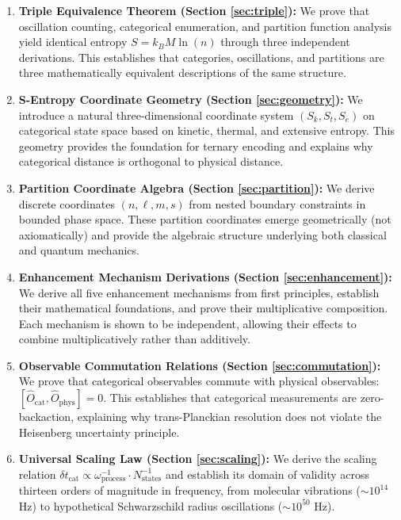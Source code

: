 \documentclass[twocolumn,10pt]{article}
\theoremstyle{remark}
\begin{document}
\begin{enumerate}
    \item \textbf{Triple Equivalence Theorem (Section \ref{sec:triple}):} We prove that oscillation counting, categorical enumeration, and partition function analysis yield identical entropy $S = k_B M \ln(n)$ through three independent derivations. This establishes that categories, oscillations, and partitions are three mathematically equivalent descriptions of the same structure.

    \item \textbf{S-Entropy Coordinate Geometry (Section \ref{sec:geometry}):} We introduce a natural three-dimensional coordinate system $(S_k, S_t, S_e)$ on categorical state space based on kinetic, thermal, and extensive entropy. This geometry provides the foundation for ternary encoding and explains why categorical distance is orthogonal to physical distance.

    \item \textbf{Partition Coordinate Algebra (Section \ref{sec:partition}):} We derive discrete coordinates $(n, \ell, m, s)$ from nested boundary constraints in bounded phase space. These partition coordinates emerge geometrically (not axiomatically) and provide the algebraic structure underlying both classical and quantum mechanics.

    \item \textbf{Enhancement Mechanism Derivations (Section \ref{sec:enhancement}):} We derive all five enhancement mechanisms from first principles, establish their mathematical foundations, and prove their multiplicative composition. Each mechanism is shown to be independent, allowing their effects to combine multiplicatively rather than additively.

    \item \textbf{Observable Commutation Relations (Section \ref{sec:commutation}):} We prove that categorical observables commute with physical observables: $[\hat{O}_{\text{cat}}, \hat{O}_{\text{phys}}] = 0$. This establishes that categorical measurements are zero-backaction, explaining why trans-Planckian resolution does not violate the Heisenberg uncertainty principle.

    \item \textbf{Universal Scaling Law (Section \ref{sec:scaling}):} We derive the scaling relation $\delta t_{\text{cat}} \propto \omega_{\text{process}}^{-1} \cdot N_{\text{states}}^{-1}$ and establish its domain of validity across thirteen orders of magnitude in frequency, from molecular vibrations ($\sim 10^{14}$ Hz) to hypothetical Schwarzschild radius oscillations ($\sim 10^{50}$ Hz).
\end{enumerate}
\end{document}
